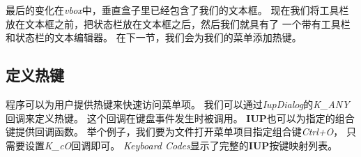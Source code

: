 \documentclass{ctexart}
\begin{document}
最后的变化在\emph{vbox}中，垂直盒子里已经包含了我们的文本框。
现在我们将工具栏放在文本框之前，把状态栏放在文本框之后，然后我们就具有了
一个带有工具栏和状态栏的文本编辑器。
在下一节，我们会为我们的菜单添加热键。

\subsection{定义热键}

程序可以为用户提供热键来快速访问菜单项。
我们可以通过\emph{IupDialog}的\emph{K\_ANY}回调来定义热键。
这个回调在键盘事件发生时被调用。
\textbf{IUP}也可以为指定的组合键提供回调函数。
举个例子，我们要为文件打开菜单项目指定组合键\emph{Ctrl+O}，
只需要设置\emph{K\_cO}回调即可。
\emph{Keyboard Codes}显示了完整的\textbf{IUP}按键映射列表。

\lstset{language=C}
\end{document}
